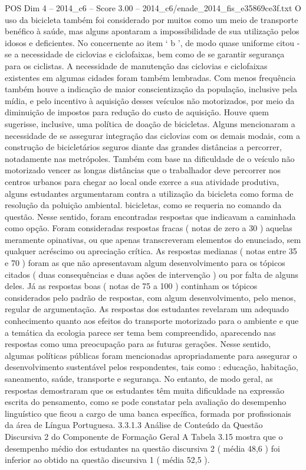 \begin{textsample}{POS Dim 4 – 2014\_c6 – Score 3.00 – 2014\_c6/enade\_2014\_fis\_e35869ce3f.txt}
O uso da bicicleta também foi considerado por muitos como um meio de transporte benéfico à saúde, mas alguns apontaram a impossibilidade de sua utilização pelos idosos e deficientes.
No concernente ao item ‘ b ’, de modo quase uniforme citou -se a necessidade de ciclovias e ciclofaixas, bem como de se garantir segurança para os ciclistas.
A necessidade de manutenção das ciclovias e ciclofaixas existentes em algumas cidades foram também lembradas.
Com menos frequência também houve a indicação de maior conscientização da população, inclusive pela mídia, e pelo incentivo à aquisição desses veículos não motorizados, por meio da diminuição de impostos para redução do custo de aquisição.
Houve quem sugerisse, inclusive, uma política de doação de bicicletas.
Alguns mencionaram a necessidade de se assegurar integração das ciclovias com os demais modais, com a construção de bicicletários seguros diante das grandes distâncias a percorrer, notadamente nas metrópoles.
Também com base na dificuldade de o veículo não motorizado vencer as longas distâncias que o trabalhador deve percorrer nos centros urbanos para chegar ao local onde exerce a sua atividade produtiva, alguns estudantes argumentaram contra a utilização da bicicleta como forma de resolução da poluição ambiental. bicicletas, como se requeria no comando da questão.
Nesse sentido, foram encontradas respostas que indicavam a caminhada como opção.
Foram consideradas respostas fracas ( notas de zero a 30 ) aquelas meramente opinativas, ou que apenas transcreveram elementos do enunciado, sem qualquer acréscimo ou apreciação crítica.
As respostas medianas ( notas entre 35 e 70 ) foram as que não apresentavam algum desenvolvimento para os tópicos citados ( duas consequências e duas ações de intervenção ) ou por falta de alguns deles.
Já as respostas boas ( notas de 75 a 100 ) continham os tópicos considerados pelo padrão de respostas, com algum desenvolvimento, pelo menos, regular de argumentação.
As respostas dos estudantes revelaram um adequado conhecimento quanto aos efeitos do transporte motorizado para o ambiente e que a temática da ecologia parece ser tema bem compreendido, aparecendo nas respostas como uma preocupação para as futuras gerações.
Nesse sentido, algumas políticas públicas foram mencionadas apropriadamente para assegurar o desenvolvimento sustentável pelos respondentes, tais como : educação, habitação, saneamento, saúde, transporte e segurança.
No entanto, de modo geral, as respostas demostraram que os estudantes têm muita dificuldade na expressão escrita do pensamento, como se pode constatar pela avaliação do desempenho linguístico que ficou a cargo de uma banca específica, formada por profissionais da área de Língua Portuguesa. 3.3.1.3 Análise de Conteúdo da Questão Discursiva 2 do Componente de Formação Geral A Tabela 3.15 mostra que o desempenho médio dos estudantes na questão discursiva 2 ( média 48,6 ) foi inferior ao obtido na questão discursiva 1 ( média 52,5 ).

\end{textsample}
